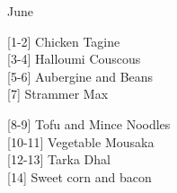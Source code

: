 		\begin{menu}{June}
    
    \begin{recipelist}
    
        {\scriptsize[1-2]} Chicken Tagine\\
        {\scriptsize[3-4]} Halloumi Couscous\\
        {\scriptsize[5-6]} Aubergine and Beans\\
        {\scriptsize[7]} Strammer Max\\%
    \end{recipelist}%
    \begin{recipelist}
    
        {\scriptsize[8-9]} Tofu and Mince Noodles\\
        {\scriptsize[10-11]} Vegetable Mousaka\\
        {\scriptsize[12-13]} Tarka Dhal\\
        {\scriptsize[14]} Sweet corn and bacon\\%
    \end{recipelist}\par%
  

\end{menu}
